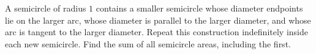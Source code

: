 A semicircle of radius $1$ contains a smaller semicircle whose diameter endpoints lie on the larger arc, whose diameter is parallel to the larger diameter, and whose arc is tangent to the larger diameter. Repeat this construction indefinitely inside each new semicircle. Find the sum of all semicircle areas, including the first.
